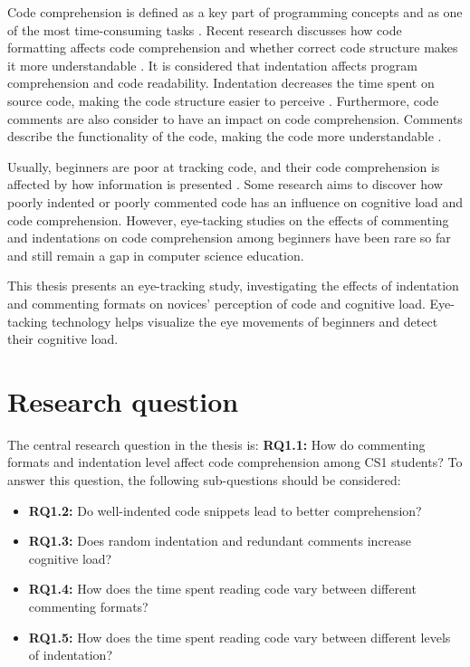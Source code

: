 Code comprehension is defined as a key part of programming concepts and as one of the most time-consuming tasks \cite{javier2021understanding}.
Recent research discusses how code formatting affects code comprehension and whether correct code structure makes it more understandable \cite{andrzejewska2020development}. It is considered that indentation affects program comprehension and code readability. Indentation decreases the time spent on source code, making the code structure easier to perceive \cite{bauer2017indentations}. Furthermore, code comments are also consider to have an impact on code comprehension. Comments describe the functionality of the code, making the code more understandable \cite{bakhuizen2019comments}.
 
Usually, beginners are poor at tracking code, and their code comprehension is affected by how information is presented \cite{robins2003learning}. Some research aims to discover how poorly indented or poorly commented code has an influence on cognitive load and code comprehension.  However, eye-tacking studies on the effects of commenting and indentations on code comprehension among beginners have been rare so far and still remain a gap in computer science education.

  
This thesis presents an eye-tracking study, investigating the effects of indentation and commenting formats on novices’ perception of code and cognitive load. Eye-tacking technology helps visualize the eye movements of beginners and detect their cognitive load. 


\section{Research question}

The central research question in the thesis is: \textbf{RQ1.1:} How do commenting formats and indentation level affect code comprehension among CS1 students? To answer this question, the following sub-questions should be considered:

\begin{itemize}
    \item \textbf{RQ1.2:} Do well-indented code snippets lead to better comprehension?
    \item \textbf{RQ1.3:} Does random indentation and redundant comments increase cognitive load?
    \item \textbf{RQ1.4:} How does the time spent reading code vary between different commenting formats?
    \item \textbf{RQ1.5:} How does the time spent reading code vary between different levels of indentation?
\end{itemize}

